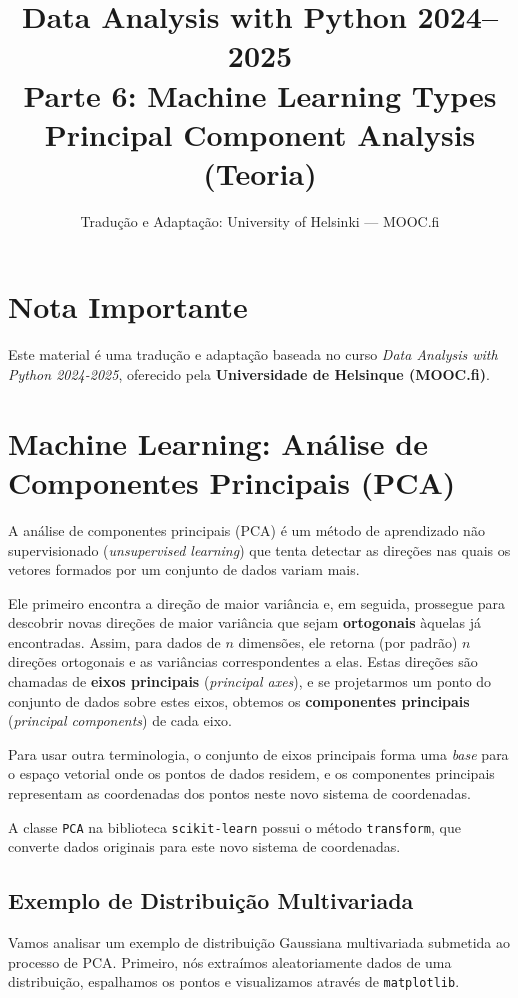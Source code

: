 \documentclass[11pt,a4paper]{article}
\title{\textbf{Data Analysis with Python 2024--2025}\\Parte 6: Machine Learning Types\\\large Principal Component Analysis (Teoria)}
\author{Tradução e Adaptação: University of Helsinki --- MOOC.fi}
\date{}
\begin{document}
\maketitle

\section*{Nota Importante}
Este material é uma tradução e adaptação baseada no curso \textit{Data Analysis with Python 2024-2025}, oferecido pela \textbf{Universidade de Helsinque (MOOC.fi)}.

\tableofcontents
\newpage

\section{Machine Learning: Análise de Componentes Principais (PCA)}

A análise de componentes principais (PCA) é um método de aprendizado não supervisionado (\emph{unsupervised learning}) que tenta detectar as direções nas quais os vetores formados por um conjunto de dados variam mais.

Ele primeiro encontra a direção de maior variância e, em seguida, prossegue para descobrir novas direções de maior variância que sejam \textbf{ortogonais} àquelas já encontradas. Assim, para dados de $n$ dimensões, ele retorna (por padrão) $n$ direções ortogonais e as variâncias correspondentes a elas. Estas direções são chamadas de \textbf{eixos principais} (\emph{principal axes}), e se projetarmos um ponto do conjunto de dados sobre estes eixos, obtemos os \textbf{componentes principais} (\emph{principal components}) de cada eixo.

Para usar outra terminologia, o conjunto de eixos principais forma uma \emph{base} para o espaço vetorial onde os pontos de dados residem, e os componentes principais representam as coordenadas dos pontos neste novo sistema de coordenadas.

A classe \texttt{PCA} na biblioteca \texttt{scikit-learn} possui o método \texttt{transform}, que converte dados originais para este novo sistema de coordenadas.

\subsection{Exemplo de Distribuição Multivariada}
Vamos analisar um exemplo de distribuição Gaussiana multivariada submetida ao processo de PCA. Primeiro, nós extraímos aleatoriamente dados de uma distribuição, espalhamos os pontos e visualizamos através de \texttt{matplotlib}.
\end{document}
